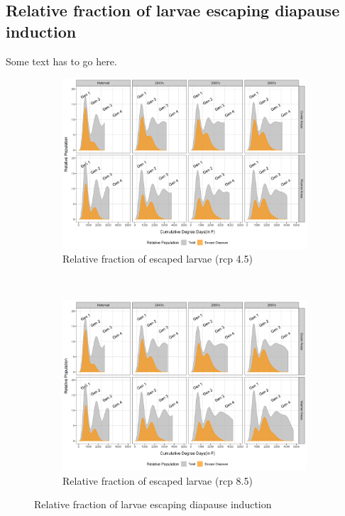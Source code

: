 \documentclass[12pt]{article}
\theoremstyle{plain}
\theoremstyle{definition}
\theoremstyle{definition}
\begin{document}
\pagebreak


\subsection{Relative fraction of larvae escaping diapause induction}
Some text has to go here.
\begin{figure}[h!]
    \centering
    \begin{subfigure}[b]{0.45\textwidth}
        \includegraphics[width=\textwidth]{figures/diapause_rel_rcp45}
        \caption{\scriptsize  Relative fraction of escaped larvae (rcp 4.5)}
        \label{fig:RFED_45)}
    \end{subfigure}
    ~ %
    \begin{subfigure}[b]{0.45\textwidth}
        \includegraphics[width=\textwidth]{figures/diapause_rel_rcp85}
        \caption{\scriptsize Relative fraction of escaped larvae (rcp 8.5)}
        \label{fig:RFED_85}
    \end{subfigure}
    \caption{Relative fraction of larvae escaping diapause induction}\label{fig:RFLEDI}
\end{figure}
\end{document}
